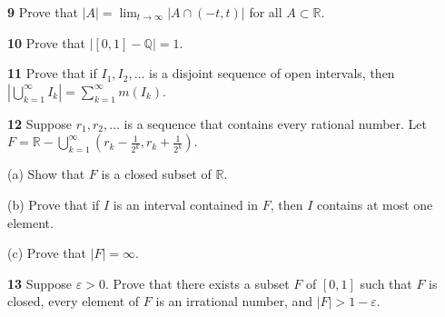 \documentclass[a4paper]{article}
\newcommand{\R}{\mathbb{R}}
\newcommand{\Q}{\mathbb{Q}}
\begin{document}
\textbf{9} Prove that $|A| = \lim_{t \to \infty} |A \cap (-t, t)|$ for all $A \subset \R$.

\textbf{10} Prove that $|[0, 1] - \Q| = 1$.

\textbf{11} Prove that if $I_1, I_2, \ldots$ is a disjoint sequence of open intervals, then $\left|\bigcup_{k=1}^\infty I_k\right| = \sum_{k=1}^\infty m(I_k)$.

\textbf{12} Suppose $r_1, r_2, \ldots$ is a sequence that contains every rational number. Let $F = \R - \bigcup_{k=1}^\infty \left(r_k - \frac{1}{2^k}, r_k + \frac{1}{2^k}\right)$.

(a) Show that $F$ is a closed subset of $\R$.

(b) Prove that if $I$ is an interval contained in $F$, then $I$ contains at most one element.

(c) Prove that $|F| = \infty$.

\textbf{13} Suppose $\varepsilon > 0$. Prove that there exists a subset $F$ of $[0, 1]$ such that $F$ is closed, every element of $F$ is an irrational number, and $|F| > 1 - \varepsilon$.
\end{document}
